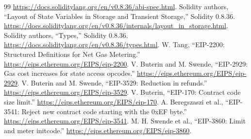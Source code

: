 \documentclass[conference]{IEEEtran}
\begin{document}
\begin{thebibliography}{99}
\url{https://docs.soliditylang.org/en/v0.8.36/abi-spec.html}.
 Solidity authors, ``Layout of State Variables in Storage and
Transient Storage,'' Solidity 0.8.36.
\url{https://docs.soliditylang.org/en/v0.8.36/internals/layout_in_storage.html}.
 Solidity authors, ``Types,'' Solidity 0.8.36.
\url{https://docs.soliditylang.org/en/v0.8.36/types.html}.
 W. Tang, ``EIP-2200: Structured Definitions for Net Gas Metering.''
\url{https://eips.ethereum.org/EIPS/eip-2200}.
 V. Buterin and M. Swende, ``EIP-2929: Gas cost increases for
state access opcodes.'' \url{https://eips.ethereum.org/EIPS/eip-2929}.
 V. Buterin and M. Swende, ``EIP-3529: Reduction in refunds.''
\url{https://eips.ethereum.org/EIPS/eip-3529}.
 V. Buterin, ``EIP-170: Contract code size limit.''
\url{https://eips.ethereum.org/EIPS/eip-170}.
 A. Beregszaszi et al., ``EIP-3541: Reject new contract code starting
with the 0xEF byte.'' \url{https://eips.ethereum.org/EIPS/eip-3541}.
 M. H. Swende et al., ``EIP-3860: Limit and meter initcode.''
\url{https://eips.ethereum.org/EIPS/eip-3860}.
\end{thebibliography}
\end{document}
